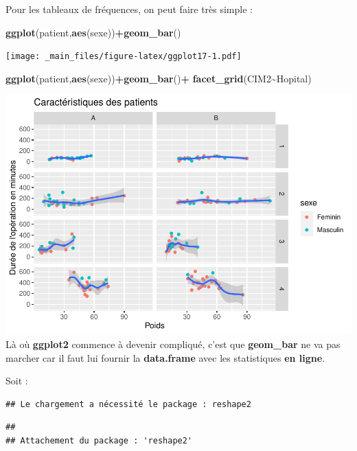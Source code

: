 \documentclass[
]{book}
\newenvironment{Shaded}{\begin{snugshade}}{\end{snugshade}}
\newcommand{\FunctionTok}[1]{\textcolor[rgb]{0.13,0.29,0.53}{\textbf{#1}}}
\newcommand{\NormalTok}[1]{#1}
\newcommand{\SpecialCharTok}[1]{\textcolor[rgb]{0.81,0.36,0.00}{\textbf{#1}}}
\begin{document}
Pour les tableaux de fréquences, on peut faire très simple :

\begin{Shaded}
\begin{Highlighting}[]
\FunctionTok{ggplot}\NormalTok{(patient,}\FunctionTok{aes}\NormalTok{(sexe))}\SpecialCharTok{+}\FunctionTok{geom\_bar}\NormalTok{()}
\end{Highlighting}
\end{Shaded}

\texttt{[image: \_main\_files/figure-latex/ggplot17-1.pdf]}

\begin{Shaded}
\begin{Highlighting}[]
\FunctionTok{ggplot}\NormalTok{(patient,}\FunctionTok{aes}\NormalTok{(sexe))}\SpecialCharTok{+}\FunctionTok{geom\_bar}\NormalTok{()}\SpecialCharTok{+}
  \FunctionTok{facet\_grid}\NormalTok{(CIM2}\SpecialCharTok{\textasciitilde{}}\NormalTok{Hopital)}
\end{Highlighting}
\end{Shaded}

\includegraphics{_main_files/figure-latex/ggplot18-1.pdf}
Là où \textbf{ggplot2} commence à devenir compliqué, c'est que \textbf{geom\_bar} ne va pas
marcher car il faut lui fournir la \textbf{data.frame} avec les statistiques \textbf{en ligne}.

Soit :

\begin{verbatim}
## Le chargement a nécessité le package : reshape2
\end{verbatim}

\begin{verbatim}
## 
## Attachement du package : 'reshape2'
\end{verbatim}
\end{document}
